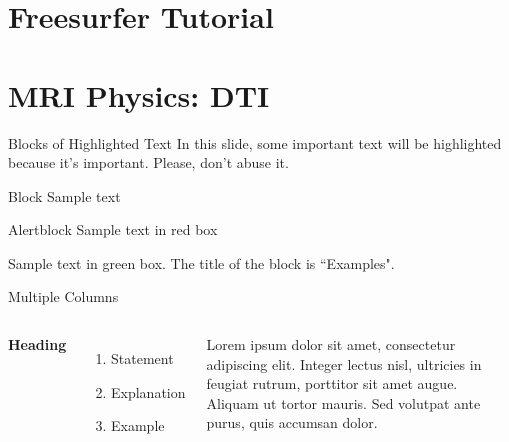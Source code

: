 \documentclass[aspectratio=169,xcolor=dvipsnames]{beamer}
\begin{document}
\section{Freesurfer Tutorial}

\section{MRI Physics: DTI}






\begin{frame}{Blocks of Highlighted Text}
    In this slide, some important text will be \alert{highlighted} because it's important. Please, don't abuse it.

    \begin{block}{Block}
        Sample text
    \end{block}

    \begin{alertblock}{Alertblock}
        Sample text in red box
    \end{alertblock}

    \begin{examples}
        Sample text in green box. The title of the block is ``Examples".
    \end{examples}
\end{frame}


\begin{frame}{Multiple Columns}
    \begin{columns}[c] %

        \textbf{Heading}
        \begin{enumerate}
            \item Statement
            \item Explanation
            \item Example
        \end{enumerate}

        Lorem ipsum dolor sit amet, consectetur adipiscing elit. Integer lectus nisl, ultricies in feugiat rutrum, porttitor sit amet augue. Aliquam ut tortor mauris. Sed volutpat ante purus, quis accumsan dolor.

    \end{columns}
\end{frame}
\end{document}
